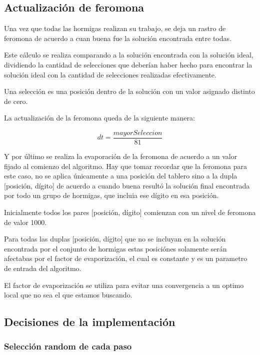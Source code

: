 \documentclass[a4paper,spanish]{article}
\begin{document}
\subsection{Actualización de feromona}

Una vez que todas las hormigas realizan su trabajo, se deja un rastro de feromona de acuerdo a cuan buena fue la solución encontrada entre todas.

Este cálculo se realiza comparando a la solución encontrada con la solución ideal, dividiendo la cantidad de selecciones que deberían 
haber hecho para encontrar la solución ideal con la cantidad de selecciones realizadas efectivamente.

Una selección es una posición dentro de la solución con un valor asignado distinto de cero.

La actualización de la feromona queda de la siguiente manera:

\begin{equation}
	dt = \dfrac{mayorSeleccion}{81}
\end{equation}

Y por último se realiza la evaporación de la feromona de acuerdo a un valor fijado al comienzo del algoritmo.
Hay que tomar recordar que la feromona para este caso, no se aplica únicamente a una posición del tablero sino
a la dupla [posición, dígito] de acuerdo a cuando buena resultó la solución final encontrada por todo un grupo
de hormigas, que incluia ese dígito en esa posición.

Inicialmente todos los pares [posición, dígito] comienzan con un nivel de feromona de valor 1000.

Para todas las duplas [posición, dígito] que no se incluyan en la solución encontrada por el conjunto de hormigas
estas posiciónes solamente serán afectabas por el factor de evaporización, el cual es constante y es un parametro
de entrada del algoritmo.

El factor de evaporización se utiliza para evitar una convergencia a un optimo local que no sea el que estamos buscando.

\subsection{Decisiones de la implementación}

\subsubsection{Selección random de cada paso}
\end{document}

